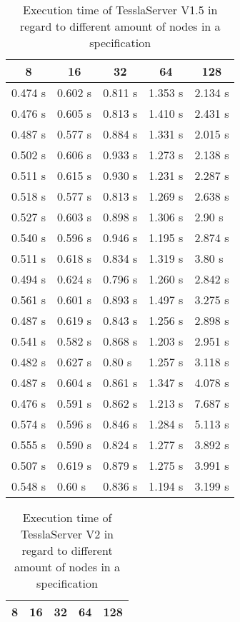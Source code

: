 \begin{table}[!htb]
  \centering
  \caption{Execution time of TesslaServer V1.5 in regard to different amount of nodes in a specification}
  \label{table:tessla_server_v1_5_num_nodes}
  \begin{tabular}{lllll}
    \multicolumn{1}{c}{8} & \multicolumn{1}{c}{16} & \multicolumn{1}{c}{32} & \multicolumn{1}{c}{64} & \multicolumn{1}{c}{128}\\ \hline
    0.474 s & 0.602 s & 0.811 s & 1.353 s & 2.134 s \\
    0.476 s & 0.605 s & 0.813 s & 1.410 s & 2.431 s \\
    0.487 s & 0.577 s & 0.884 s & 1.331 s & 2.015 s \\
    0.502 s & 0.606 s & 0.933 s & 1.273 s & 2.138 s \\
    0.511 s & 0.615 s & 0.930 s & 1.231 s & 2.287 s \\
    0.518 s & 0.577 s & 0.813 s & 1.269 s & 2.638 s \\
    0.527 s & 0.603 s & 0.898 s & 1.306 s & 2.90 s  \\
    0.540 s & 0.596 s & 0.946 s & 1.195 s & 2.874 s \\
    0.511 s & 0.618 s & 0.834 s & 1.319 s & 3.80 s  \\
    0.494 s & 0.624 s & 0.796 s & 1.260 s & 2.842 s \\
    0.561 s & 0.601 s & 0.893 s & 1.497 s & 3.275 s \\
    0.487 s & 0.619 s & 0.843 s & 1.256 s & 2.898 s \\
    0.541 s & 0.582 s & 0.868 s & 1.203 s & 2.951 s \\
    0.482 s & 0.627 s & 0.80 s  & 1.257 s & 3.118 s \\
    0.487 s & 0.604 s & 0.861 s & 1.347 s & 4.078 s \\
    0.476 s & 0.591 s & 0.862 s & 1.213 s & 7.687 s \\
    0.574 s & 0.596 s & 0.846 s & 1.284 s & 5.113 s \\
    0.555 s & 0.590 s & 0.824 s & 1.277 s & 3.892 s \\
    0.507 s & 0.619 s & 0.879 s & 1.275 s & 3.991 s \\
    0.548 s & 0.60 s  & 0.836 s & 1.194 s & 3.199 s
  \end{tabular}
\end{table}

\begin{table}[!htb]
  \centering
  \caption{Execution time of TesslaServer V2 in regard to different amount of nodes in a specification}
  \label{table:tessla_server_v2_num_nodes}
  \begin{tabular}{lllll}
    \multicolumn{1}{c}{8} & \multicolumn{1}{c}{16} & \multicolumn{1}{c}{32} & \multicolumn{1}{c}{64} & \multicolumn{1}{c}{128}\\ \hline
  \end{tabular}
\end{table}

